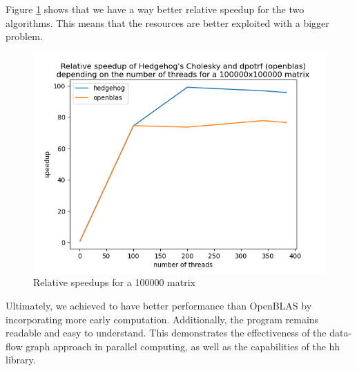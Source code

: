 Figure \ref{fig:relativespeedup100000} shows that we have a way better
relative speedup for the two algorithms. This means that the resources are
better exploited with a bigger problem.

\begin{figure}[!ht]
  \begin{center}
    \includegraphics[scale=0.8]{img/cho-img/relative-speedup-100000.png}
    \caption{Relative speedups for a 100000 matrix}
    \label{fig:relativespeedup100000}
  \end{center}
\end{figure}

Ultimately, we achieved to have better performance than OpenBLAS by
incorporating more early computation. Additionally, the program remains readable
and easy to understand. This demonstrates the effectiveness of the data-flow
graph approach in parallel computing, as well as the capabilities of the
\gls{hh} library.
